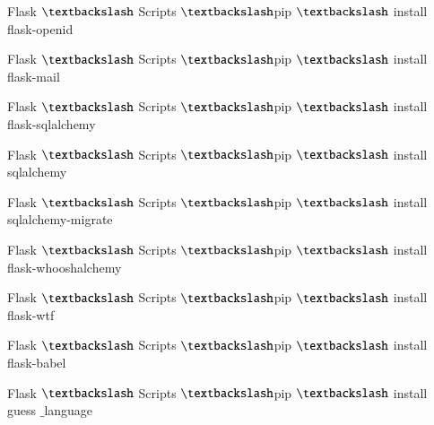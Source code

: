\documentclass[a4paper,12pt]{report}
\begin{document}
\vspace{14pt}
\noindent 
{\fontsize{14pt}{14pt}\selectfont Flask $  \textbackslash  $ Scripts  $  \textbackslash  $pip $  \textbackslash  $ install flask-openid \\} \par
\vspace{14pt}
\noindent 
{\fontsize{14pt}{14pt}\selectfont Flask $  \textbackslash  $ Scripts  $  \textbackslash  $pip $  \textbackslash  $ install flask-mail \\} \par
\vspace{14pt}
\noindent 
{\fontsize{14pt}{14pt}\selectfont Flask $  \textbackslash  $ Scripts  $  \textbackslash  $pip $  \textbackslash  $ install flask-sqlalchemy \\} \par
\vspace{14pt}
\noindent 
{\fontsize{14pt}{14pt}\selectfont Flask $  \textbackslash  $ Scripts  $  \textbackslash  $pip $  \textbackslash  $ install sqlalchemy \\} \par
\vspace{14pt}
\noindent 
{\fontsize{14pt}{14pt}\selectfont Flask $  \textbackslash  $ Scripts  $  \textbackslash  $pip $  \textbackslash  $ install sqlalchemy-migrate \\} \par
\vspace{14pt}
\noindent 
{\fontsize{14pt}{14pt}\selectfont Flask $  \textbackslash  $ Scripts  $  \textbackslash  $pip $  \textbackslash  $ install flask-whooshalchemy \\} \par
\vspace{14pt}
\noindent 
{\fontsize{14pt}{14pt}\selectfont Flask $  \textbackslash  $ Scripts  $  \textbackslash  $pip $  \textbackslash  $ install flask-wtf \\} \par
\vspace{14pt}
\noindent 
{\fontsize{14pt}{14pt}\selectfont Flask $  \textbackslash  $ Scripts  $  \textbackslash  $pip $  \textbackslash  $ install flask-babel \\} \par
\vspace{14pt}
\noindent 
{\fontsize{14pt}{14pt}\selectfont Flask $  \textbackslash  $ Scripts  $  \textbackslash  $pip $  \textbackslash  $ install guess $  \_  $language \\} \par
\end{document}
